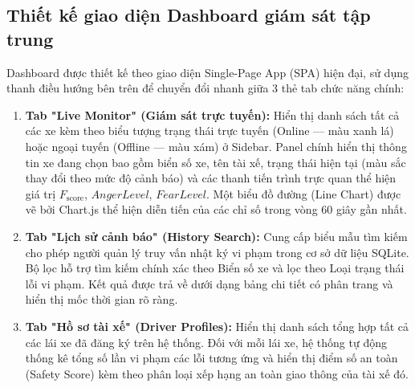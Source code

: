 \documentclass[../DoAn.tex]{subfiles}
\begin{document}
\subsection{Thiết kế giao diện Dashboard giám sát tập trung}
Dashboard được thiết kế theo giao diện Single-Page App (SPA) hiện đại, sử dụng thanh điều hướng bên trên để chuyển đổi nhanh giữa 3 thẻ tab chức năng chính:
\begin{enumerate}
    \item \textbf{Tab "Live Monitor" (Giám sát trực tuyến):} Hiển thị danh sách tất cả các xe kèm theo biểu tượng trạng thái trực tuyến (Online --- màu xanh lá) hoặc ngoại tuyến (Offline --- màu xám) ở Sidebar. Panel chính hiển thị thông tin xe đang chọn bao gồm biển số xe, tên tài xế, trạng thái hiện tại (màu sắc thay đổi theo mức độ cảnh báo) và các thanh tiến trình trực quan thể hiện giá trị $F_{\text{score}}$, $AngerLevel$, $FearLevel$. Một biểu đồ đường (Line Chart) được vẽ bởi Chart.js thể hiện diễn tiến của các chỉ số trong vòng 60 giây gần nhất.
    \item \textbf{Tab "Lịch sử cảnh báo" (History Search):} Cung cấp biểu mẫu tìm kiếm cho phép người quản lý truy vấn nhật ký vi phạm trong cơ sở dữ liệu SQLite. Bộ lọc hỗ trợ tìm kiếm chính xác theo Biển số xe và lọc theo Loại trạng thái lỗi vi phạm. Kết quả được trả về dưới dạng bảng chi tiết có phân trang và hiển thị mốc thời gian rõ ràng.
    \item \textbf{Tab "Hồ sơ tài xế" (Driver Profiles):} Hiển thị danh sách tổng hợp tất cả các lái xe đã đăng ký trên hệ thống. Đối với mỗi lái xe, hệ thống tự động thống kê tổng số lần vi phạm các lỗi tương ứng và hiển thị điểm số an toàn (Safety Score) kèm theo phân loại xếp hạng an toàn giao thông của tài xế đó.
\end{enumerate}
\end{document}
